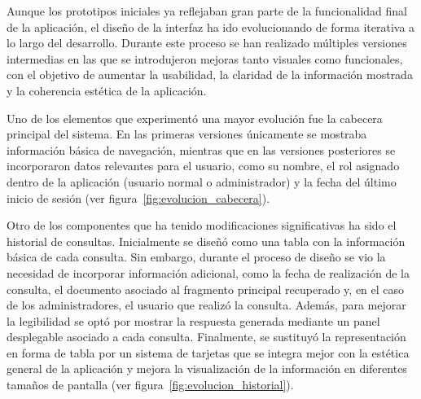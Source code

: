 

Aunque los prototipos iniciales ya reflejaban gran parte de la funcionalidad final de la aplicación, el diseño de la interfaz ha ido evolucionando de forma iterativa a lo largo del desarrollo. Durante este proceso se han realizado múltiples versiones intermedias en las que se introdujeron mejoras tanto visuales como funcionales, con el objetivo de aumentar la usabilidad, la claridad de la información mostrada y la coherencia estética de la aplicación.

Uno de los elementos que experimentó una mayor evolución fue la cabecera principal del sistema. En las primeras versiones únicamente se mostraba información básica de navegación, mientras que en las versiones posteriores se incorporaron datos relevantes para el usuario, como su nombre, el rol asignado dentro de la aplicación (usuario normal o administrador) y la fecha del último inicio de sesión (ver figura~\ref{fig:evolucion_cabecera}).

Otro de los componentes que ha tenido modificaciones significativas ha sido el historial de consultas. Inicialmente se diseñó como una tabla con la información básica de cada consulta. Sin embargo, durante el proceso de diseño se vio la necesidad de incorporar información adicional, como la fecha de realización de la consulta, el documento asociado al fragmento principal recuperado y, en el caso de los administradores, el usuario que realizó la consulta. Además, para mejorar la legibilidad se optó por mostrar la respuesta generada mediante un panel desplegable asociado a cada consulta. Finalmente, se sustituyó la representación en forma de tabla por un sistema de tarjetas que se integra mejor con la estética general de la aplicación y mejora la visualización de la información en diferentes tamaños de pantalla (ver figura~\ref{fig:evolucion_historial}).

